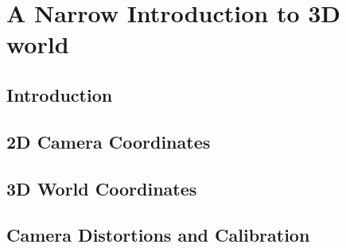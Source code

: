  

\chapter[Preface]{A Narrow Introduction to 3D world}

\section{Introduction}
\section{2D Camera Coordinates}
\section{3D World Coordinates}
\section{Camera Distortions and Calibration}



